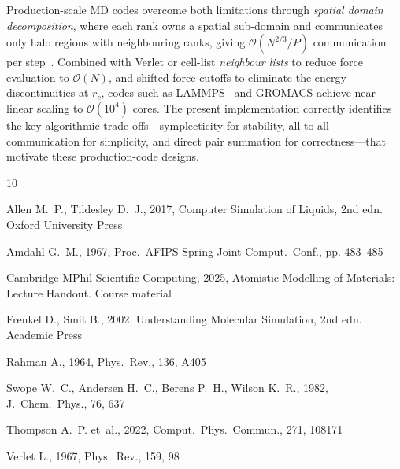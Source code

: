 \documentclass[10pt,twocolumn]{article}
\begin{document}
Production-scale MD codes overcome both limitations through \emph{spatial
domain decomposition}, where each rank owns a spatial sub-domain and
communicates only halo regions with neighbouring ranks, giving
$\mathcal{O}(N^{2/3}/P)$ communication per step~\citep{AllenTildesley2017}.
Combined with Verlet or cell-list \emph{neighbour lists} to reduce force
evaluation to $\mathcal{O}(N)$, and shifted-force cutoffs to eliminate
the energy discontinuities at $r_c$, codes such as LAMMPS~\citep{Thompson2022}
and GROMACS achieve near-linear scaling to $\mathcal{O}(10^4)$ cores.
The present implementation correctly identifies the key algorithmic
trade-offs---symplecticity for stability, all-to-all communication for
simplicity, and direct pair summation for correctness---that motivate these
production-code designs.



\begin{thebibliography}{10}

Allen M.~P., Tildesley D.~J., 2017, Computer Simulation of Liquids, 2nd edn.
Oxford University Press

Amdahl G.~M., 1967, Proc.\ AFIPS Spring Joint Comput.\ Conf., pp. 483--485

{Cambridge MPhil Scientific Computing}, 2025, Atomistic Modelling of Materials:
Lecture Handout. Course material

Frenkel D., Smit B., 2002, Understanding Molecular Simulation, 2nd edn.
Academic Press

Rahman A., 1964, Phys.\ Rev., 136, A405

Swope W.~C., Andersen H.~C., Berens P.~H., Wilson K.~R., 1982,
J.\ Chem.\ Phys., 76, 637

Thompson A.~P. et~al., 2022, Comput.\ Phys.\ Commun., 271, 108171

Verlet L., 1967, Phys.\ Rev., 159, 98

\end{thebibliography}
\end{document}
